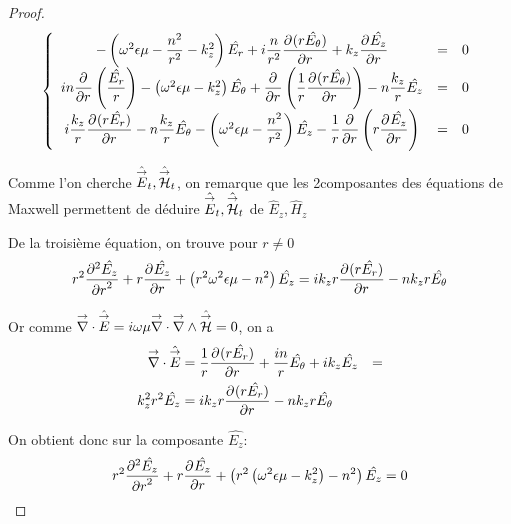 \begin{proof}
        \begin{equation}
            \left\lbrace
            \begin{array}{ccc}
                -\left(\w^2\eps\mu -\frac{n^2}{r^2}  - k_z^2\right)\hat{E_r}  +i\frac{n}{r^2}\ddr{r}{(r\hat{E_\theta})}  +k_z\ddr{r}{\hat{E_z}} & = & 0\\
                in\ddr{r}{}\left(\frac{\hat{E_r}}{r}\right) -\left(\w^2\eps\mu - k_z^2\right)\hat{E_\theta} + \ddr{r}{}\left(\frac{1}{r}\ddr{r}{(r\hat{E_\theta})}\right)  - n\frac{k_z}{r}\hat{E_z} & = & 0\\
                i\frac{k_z}{r}\ddr{r}{(r\hat{E_r})}  - n\frac{k_z}{r}\hat{E_\theta}  -\left(\w^2\eps\mu - \frac{n^2}{r^2} \right)\hat{E_z} - \frac{1}{r}\ddr{r}{}\left(r\ddr{r}{\hat{E_z}}\right) & = & 0
            \end{array}
            \right.
        \end{equation}

        Comme l'on cherche \(\hat \vE_t, \hat \vH_t\), on remarque que les 2\ieme composantes des équations de Maxwell permettent de déduire \(\hat\vE_t, \hat\vH_t\) de \( \hat E_z, \hat H_z\)

        De la troisième  équation, on trouve pour \(r\not=0\)
        \begin{equation}
        r^2 \ddr[2]{r}{\hat{E_z}} + r\ddr{r}{\hat{E_z}} + \left(r^2\w^2\eps\mu - n^2\right)\hat{E_z} =ik_zr\ddr{r}{(r\hat{E_r})} -  nk_zr\hat{E_\theta}
        \end{equation}

        Or comme \(\vdiv \hat \vE = i\w\mu\vdiv\vrot \hat \vH = 0\), on a
        \begin{align}
            \vdiv\hat \vE &= \frac{1}{r}\ddr{r}{(r\hat{E_r})} + \frac{in}{r}\hat{E_\theta} + ik_z\hat{E_z} &=
            \\
            k_z^2r^2 \hat{E_z} &= ik_zr\ddr{r}{(r\hat{E_r})} - nk_zr\hat{E_\theta}
        \end{align}

        On obtient donc sur la composante \(\hat{E_z}\):
        \begin{equation}
            r^2 \ddr[2]{r}{\hat{E_z}} + r\ddr{r}{\hat{E_z}} + \left(r^2\left(\w^2\eps\mu - k_z^2\right) - n^2\right)\hat{E_z} = 0
        \end{equation}


\end{proof}

